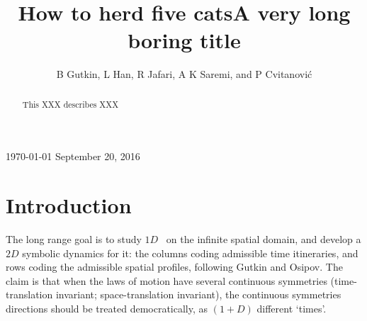 \documentclass[12pt]{iopart}
\begin{document}
    \ifboyscout
    \title[Herding cats]            %
{How to herd five cats}
    \else
    \title[Bore me]                 %
{A very long boring title}
    \fi

    \author{
B Gutkin,
L Han,
R Jafari,
A K Saremi,
         and
P Cvitanovi{\'c}
    }\address{
Center for Nonlinear Science, School of Physics,
            Georgia Institute of Technology,
            Atlanta, GA 30332-0430, USA
    } 
    \vspace{10pt}
    \begin{indented}
    \item[]
    \ifboyscout\today\else
September 20, 2016
    \fi
    \end{indented}

\begin{abstract}
This XXX describes XXX
\end{abstract}



\submitto{\NL}
    \ifsubmission
\maketitle %
    \fi


\section{Introduction}
\label{sect:intro}

The long range goal is  to
study $1D$ \KS\ on the infinite spatial domain, and develop a $2D$
symbolic dynamics for it: the columns coding admissible time itineraries,
and rows coding the admissible spatial profiles,
following Gutkin and Osipov. The claim is that when
the laws of motion have several continuous symmetries (time-translation invariant;
space-translation invariant), the continuous symmetries directions
should be treated democratically, as
$(1+D)$ different `times'.
\end{document}
